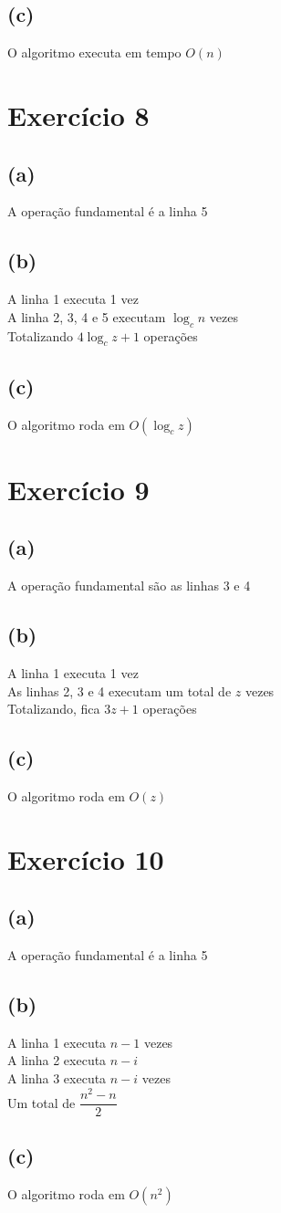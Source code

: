 \documentclass{article}
\begin{document}
\subsection*{(c)}
O algoritmo executa em tempo $O(n)$

\section{Exercício 8}
\subsection*{(a)}
A operação fundamental é a linha 5
\subsection*{(b)}
A linha 1 executa 1 vez\\
A linha 2, 3, 4 e 5 executam $\log_c n$ vezes\\
Totalizando $4\log_c z + 1$ operações
\subsection*{(c)}
O algoritmo roda em $O(\log_c z)$

\section{Exercício 9}
\subsection*{(a)}
A operação fundamental são as linhas 3 e 4
\subsection*{(b)}
A linha 1 executa 1 vez\\
As linhas 2, 3 e 4 executam um total de $z$ vezes\\
Totalizando, fica $3z+1$ operações
\subsection*{(c)}
O algoritmo roda em $O(z)$

\section{Exercício 10}
\subsection*{(a)}
A operação fundamental é a linha 5
\subsection*{(b)}
A linha 1 executa $n-1$ vezes\\
A linha 2 executa $n-i$\\
A linha 3 executa $n-i$ vezes\\
Um total de $\dfrac{n^2-n}{2}$
\subsection*{(c)}
O algoritmo roda em $O(n^2)$
\end{document}
